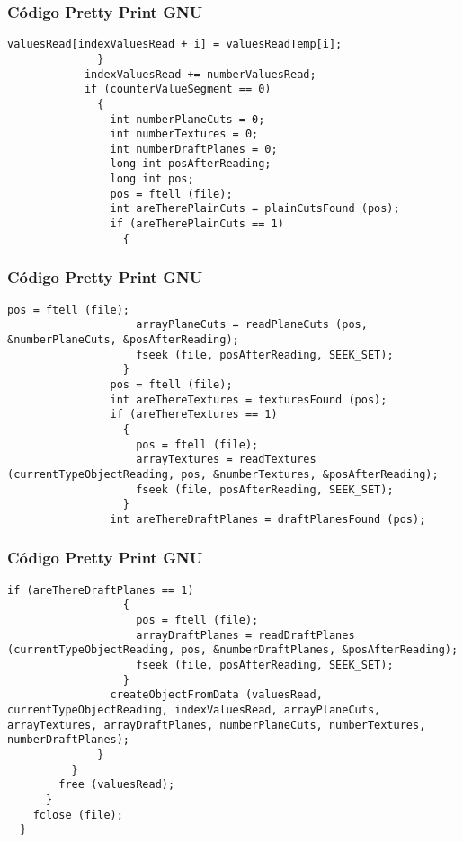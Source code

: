 \documentclass{beamer}
\begin{document}
\begin{frame}[fragile]
\frametitle{C\'odigo Pretty Print GNU}
\begin{lstlisting}[style=CStyle]
                valuesRead[indexValuesRead + i] = valuesReadTemp[i];
              }
            indexValuesRead += numberValuesRead;
            if (counterValueSegment == 0)
              {
                int numberPlaneCuts = 0;
                int numberTextures = 0;
                int numberDraftPlanes = 0;
                long int posAfterReading;
                long int pos;
                pos = ftell (file);
                int areTherePlainCuts = plainCutsFound (pos);
                if (areTherePlainCuts == 1)
                  {
                    \end{lstlisting}
\end{frame}
\begin{frame}[fragile]
\frametitle{C\'odigo Pretty Print GNU}
\begin{lstlisting}[style=CStyle]
                    pos = ftell (file);
                    arrayPlaneCuts = readPlaneCuts (pos, &numberPlaneCuts, &posAfterReading);
                    fseek (file, posAfterReading, SEEK_SET);
                  }
                pos = ftell (file);
                int areThereTextures = texturesFound (pos);
                if (areThereTextures == 1)
                  {
                    pos = ftell (file);
                    arrayTextures = readTextures (currentTypeObjectReading, pos, &numberTextures, &posAfterReading);
                    fseek (file, posAfterReading, SEEK_SET);
                  }
                int areThereDraftPlanes = draftPlanesFound (pos);
\end{lstlisting}
\end{frame}
\begin{frame}[fragile]
\frametitle{C\'odigo Pretty Print GNU}
\begin{lstlisting}[style=CStyle]
                if (areThereDraftPlanes == 1)
                  {
                    pos = ftell (file);
                    arrayDraftPlanes = readDraftPlanes (currentTypeObjectReading, pos, &numberDraftPlanes, &posAfterReading);
                    fseek (file, posAfterReading, SEEK_SET);
                  }
                createObjectFromData (valuesRead, currentTypeObjectReading, indexValuesRead, arrayPlaneCuts, arrayTextures, arrayDraftPlanes, numberPlaneCuts, numberTextures, numberDraftPlanes);
              }
          }
        free (valuesRead);
      }
    fclose (file);
  }
\end{lstlisting}
\end{frame}
\end{document}
